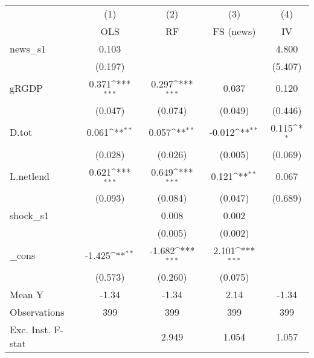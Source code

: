{
\def\sym#1{\ifmmode^{#1}\else\(^{#1}\)\fi}
\begin{tabular}{l*{4}{c}}
\toprule
            &\multicolumn{1}{c}{(1)}&\multicolumn{1}{c}{(2)}&\multicolumn{1}{c}{(3)}&\multicolumn{1}{c}{(4)}\\
            &\multicolumn{1}{c}{OLS}&\multicolumn{1}{c}{RF}&\multicolumn{1}{c}{FS (news)}&\multicolumn{1}{c}{IV}\\
\midrule
news\_s1     &       0.103         &                     &                     &       4.800         \\
            &     (0.197)         &                     &                     &     (5.407)         \\
\addlinespace
gRGDP       &       0.371\sym{***}&       0.297\sym{***}&       0.037         &       0.120         \\
            &     (0.047)         &     (0.074)         &     (0.049)         &     (0.446)         \\
\addlinespace
D.tot       &       0.061\sym{**} &       0.057\sym{**} &      -0.012\sym{**} &       0.115\sym{*}  \\
            &     (0.028)         &     (0.026)         &     (0.005)         &     (0.069)         \\
\addlinespace
L.netlend   &       0.621\sym{***}&       0.649\sym{***}&       0.121\sym{**} &       0.067         \\
            &     (0.093)         &     (0.084)         &     (0.047)         &     (0.689)         \\
\addlinespace
shock\_s1    &                     &       0.008         &       0.002         &                     \\
            &                     &     (0.005)         &     (0.002)         &                     \\
\addlinespace
\_cons      &      -1.425\sym{**} &      -1.682\sym{***}&       2.101\sym{***}&                     \\
            &     (0.573)         &     (0.260)         &     (0.075)         &                     \\
\midrule
Mean Y      &       -1.34         &       -1.34         &        2.14         &       -1.34         \\
Observations&         399         &         399         &         399         &         399         \\
Exc. Inst. F-stat&                     &       2.949         &       1.054         &       1.057         \\
\bottomrule
\end{tabular}
}
